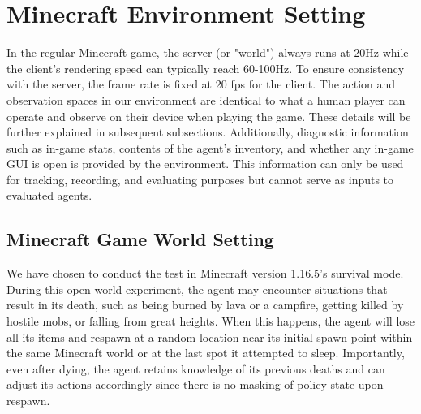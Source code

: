 \newpage











\newpage
\section{Minecraft Environment Setting}
\label{app:minecraft_environment}
In the regular Minecraft game, the server (or "world") always runs at 20Hz while the client's rendering speed can typically reach 60-100Hz. To ensure consistency with the server, the frame rate is fixed at 20 fps for the client. The action and observation spaces in our environment are identical to what a human player can operate and observe on their device when playing the game. These details will be further explained in subsequent subsections. Additionally, diagnostic information such as in-game stats, contents of the agent's inventory, and whether any in-game GUI is open is provided by the environment. This information can only be used for tracking, recording, and evaluating purposes but cannot serve as inputs to evaluated agents.

\subsection{Minecraft Game World Setting}
We have chosen to conduct the test in Minecraft version 1.16.5's survival mode. During this open-world experiment, the agent may encounter situations that result in its death, such as being burned by lava or a campfire, getting killed by hostile mobs, or falling from great heights. When this happens, the agent will lose all its items and respawn at a random location near its initial spawn point within the same Minecraft world or at the last spot it attempted to sleep. Importantly, even after dying, the agent retains knowledge of its previous deaths and can adjust its actions accordingly since there is no masking of policy state upon respawn.

